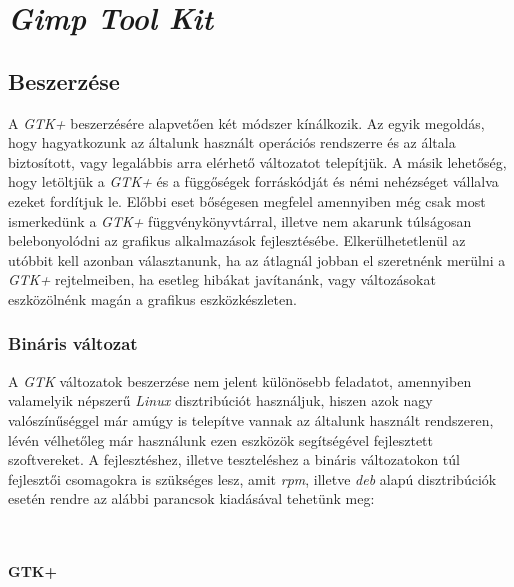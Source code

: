 \section{\textit{Gimp Tool Kit}}

\subsection{Beszerzése}

A \textit{GTK+} beszerzésére alapvetően két módszer kínálkozik. Az egyik megoldás, hogy hagyatkozunk az általunk használt operációs rendszerre és az általa biztosított, vagy legalábbis arra elérhető változatot telepítjük. A másik lehetőség, hogy letöltjük a \textit{GTK+} és a függőségek forráskódját és némi nehézséget vállalva ezeket fordítjuk le. Előbbi eset bőségesen megfelel amennyiben még csak most ismerkedünk a \textit{GTK+} függvénykönyvtárral, illetve nem akarunk túlságosan belebonyolódni az grafikus alkalmazások fejlesztésébe. Elkerülhetetlenül az utóbbit kell azonban választanunk, ha az átlagnál jobban el szeretnénk merülni a \textit{GTK+} rejtelmeiben, ha esetleg hibákat javítanánk, vagy változásokat eszközölnénk magán a grafikus eszközkészleten.

\subsubsection{Bináris változat}

A \textit{GTK} változatok beszerzése nem jelent különösebb feladatot, amennyiben valamelyik népszerű \textit{Linux} disztribúciót használjuk, hiszen azok nagy valószínűséggel már amúgy is telepítve vannak az általunk használt rendszeren, lévén vélhetőleg már használunk ezen eszközök segítségével fejlesztett szoftvereket. A fejlesztéshez, illetve teszteléshez a bináris változatokon túl fejlesztői csomagokra is szükséges lesz, amit \textit{rpm}, illetve \textit{deb} alapú disztribúciók esetén rendre az alábbi parancsok kiadásával tehetünk meg:

\\

\paragraph{GTK+}

